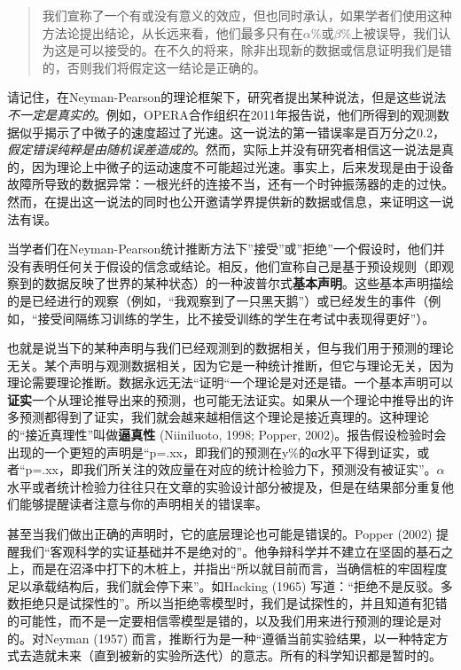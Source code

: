 \documentclass[
  letterpaper,
  DIV=11,
  numbers=noendperiod]{scrreprt}
\begin{document}
\begin{quote}
我们宣称了一个有或没有意义的效应，但也同时承认，如果学者们使用这种方法论提出结论，从长远来看，他们最多只有在\(\alpha\)\%或\(\beta\)\%上被误导，我们认为这是可以接受的。在不久的将来，除非出现新的数据或信息证明我们是错的，否则我们将假定这一结论是正确的。
\end{quote}

请记住，在Neyman-Pearson的理论框架下，研究者提出某种说法，但是这些说法\emph{不一定是真实的}。例如，OPERA合作组织在2011年报告说，他们所得到的观测数据似乎揭示了中微子的速度超过了光速。这一说法的第一错误率是百万分之0.2，\emph{假定错误纯粹是由随机误差造成的}。然而，实际上并没有研究者相信这一说法是真的，因为理论上中微子的运动速度不可能超过光速。事实上，后来发现是由于设备故障所导致的数据异常：一根光纤的连接不当，还有一个时钟振荡器的走的过快。然而，在提出这一说法的同时也公开邀请学界提供新的数据或信息，来证明这一说法有误。

当学者们在Neyman-Pearson统计推断方法下''接受''或''拒绝''一个假设时，他们并没有表明任何关于假设的信念或结论。相反，他们宣称自己是基于预设规则（即观察到的数据反映了世界的某种状态）的一种波普尔式\textbf{基本声明}。这些基本声明描绘的是已经进行的观察（例如，``我观察到了一只黑天鹅''）或已经发生的事件（例如，``接受间隔练习训练的学生，比不接受训练的学生在考试中表现得更好''）。

也就是说当下的某种声明与我们已经观测到的数据相关，但与我们用于预测的理论无关。某个声明与观测数据相关，因为它是一种统计推断，但它与理论无关，因为理论需要理论推断。数据永远无法``证明``一个理论是对还是错。一个基本声明可以\textbf{证实}一个从理论推导出来的预测，也可能无法证实。如果从一个理论中推导出的许多预测都得到了证实，我们就会越来越相信这个理论是接近真理的。这种理论的``接近真理性''叫做\textbf{逼真性}
(Niiniluoto, 1998; Popper,
2002)。报告假设检验时会出现的一个更短的声明是``p=.xx，即我们的预测在y\%的α水平下得到证实，或者``p=.xx，即我们所关注的效应量在对应的统计检验力下，预测没有被证实''。\(\alpha\)水平或者统计检验力往往只在文章的实验设计部分被提及，但是在结果部分重复他们能够提醒读者注意与你的声明相关的错误率。

甚至当我们做出正确的声明时，它的底层理论也可能是错误的。Popper (2002)
提醒我们``客观科学的实证基础并不是绝对的''。他争辩科学并不建立在坚固的基石之上，而是在沼泽中打下的木桩上，并指出``所以就目前而言，当确信桩的牢固程度足以承载结构后，我们就会停下来''。如Hacking
(1965)
写道：``拒绝不是反驳。多数拒绝只是试探性的''。所以当拒绝零模型时，我们是试探性的，并且知道有犯错的可能性，而不是一定要相信零模型是错的，以及我们用来进行预测的理论是对的。对Neyman
(1957)
而言，推断行为是一种``遵循当前实验结果，以一种特定方式去造就未来（直到被新的实验所迭代）的意志。所有的科学知识都是暂时的。
\end{document}
